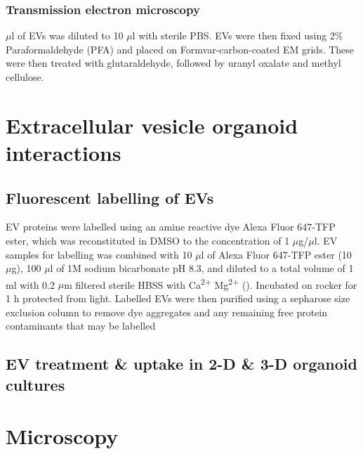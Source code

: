 \documentclass[a4paper]{report}
\begin{document}
\subsubsection{Transmission electron microscopy}
 $\mu$l of EVs was diluted to 10 $\mu$l with sterile PBS. EVs were then fixed using 2\% Paraformaldehyde (PFA) and placed on Formvar-carbon-coated EM grids. These were then treated with glutaraldehyde, followed by uranyl oxalate and methyl cellulose.
\section{Extracellular vesicle organoid interactions}
\subsection{Fluorescent labelling of EVs}
EV proteins were labelled using an amine reactive dye Alexa Fluor 647-TFP ester, which was reconstituted in DMSO to the concentration of 1 $\mu$g/$\mu$l. EV samples for labelling was combined with 10 $\mu$l of Alexa Fluor 647-TFP ester (10 $\mu$g), 100 $\mu$l of 1M sodium bicarbonate pH 8.3, and diluted to a total volume of 1 ml with 0.2 $\mu$m filtered sterile HBSS with Ca\textsuperscript{2+} Mg\textsuperscript{2+} (). Incubated on rocker for 1 h protected from light. Labelled EVs were then purified using a sepharose size exclusion column to remove dye aggregates and any remaining free protein contaminants that may be labelled 
\citep{Buck2014ExosomesImmunity}
\subsection{EV treatment \& uptake in 2-D \& 3-D organoid cultures}
\section{Microscopy}
\end{document}

